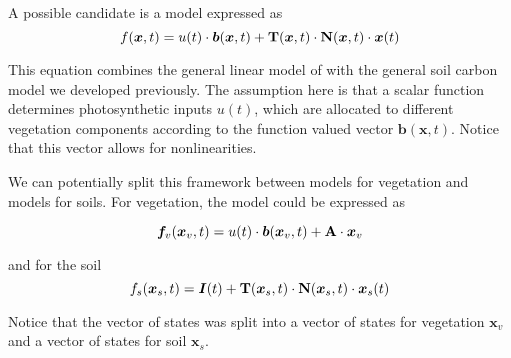 \documentclass[11pt,a4paper]{article}
\begin{document}
A possible candidate is a model expressed as
\begin{equation}
f({\bm x}, t) = u(t) \cdot {\bm b}({\bm x}, t) + {\bf T}({\bm x}, t) \cdot {\bf N}({\bm x}, t) \cdot {\bm x}(t)
\end{equation}

This equation combines the general linear model of \citet{Weng2011EA} with the general soil carbon model we developed previously. The assumption here is that a scalar function determines photosynthetic inputs $u(t)$, which are allocated to different vegetation components according to the function valued vector ${\bm b}({\bm x}, t)$. Notice that this vector allows for nonlinearities. 

We can potentially split this framework between models for vegetation and models for soils. For vegetation, the model could be expressed as

\begin{equation} \label{fv}
{\bm f_v}({\bm x_v}, t) =u(t) \cdot {\bm b}({\bm x_v}, t) + {\bf A} \cdot {\bm x_v}
\end{equation}

and for the soil
\begin{equation} \label{fs}
f_s({\bm x_s}, t) = {\bm I}(t) + {\bf T}({\bm x_s}, t) \cdot {\bf N}({\bm x_s}, t) \cdot {\bm x_s}(t)
\end{equation}

Notice that the vector of states was split into a vector of states for vegetation ${\bm x_v}$ and a vector of states for soil ${\bm x_s}$.
\end{document}
